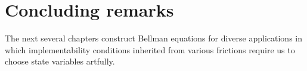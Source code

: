 %
%
%
%


\section{Concluding remarks}

The next several chapters  construct Bellman equations for diverse applications in which  implementability conditions inherited from various frictions  require
us to choose state variables artfully.


